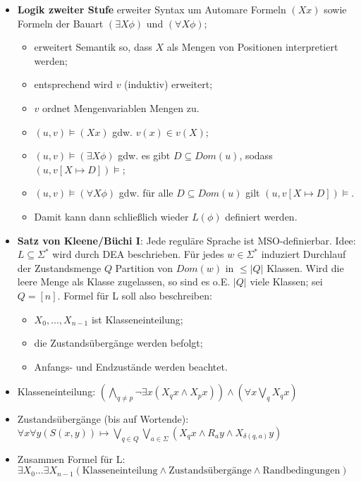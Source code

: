 \documentclass[12pt, a4paper]{article}
\begin{document}
\begin{itemize}
		\item \textbf{Logik zweiter Stufe} erweiter Syntax um Automare Formeln $(Xx)$ sowie Formeln der Bauart $(\exists X\phi)$ und $(\forall X\phi)$;
		\begin{itemize}
			\item erweitert Semantik so, dass $X$ als Mengen von Positionen interpretiert werden;
			\item entsprechend wird $v$ (induktiv) erweitert; 
			\item $v$ ordnet Mengenvariablen Mengen zu.
			\item $(u,v)\vDash (Xx)$ gdw. $v(x)\in v(X)$;
			\item $(u,v)\vDash (\exists X\phi)$ gdw. es gibt $D\subseteq Dom(u)$, sodass $(u,v[X\mapsto D]) \vDash $;
			\item $(u,v)\vDash (\forall X\phi)$ gdw. für alle $D\subseteq Dom(u)$ gilt $(u,v[X\mapsto D]) \vDash$.
			\item Damit kann dann schließlich wieder $L(\phi)$ definiert werden.
		\end{itemize}
		
		\item \textbf{Satz von Kleene/Büchi I}: Jede reguläre Sprache ist MSO-definierbar.
			\subitem Idee: $L\subseteq\Sigma^{*}$ wird durch DEA beschrieben.
			\subitem Für jedes $w\in\Sigma^{*}$ induziert Durchlauf der Zustandsmenge $Q$ Partition von $Dom(w)$ in $\leq|Q|$ Klassen. Wird die leere Menge als Klasse zugelassen, so sind es o.E. $|Q|$ viele Klassen; sei $Q = [n]$.
			\subitem Formel für L soll also beschreiben:
			\begin{itemize}
				\item $X_{0},...,X_{n-1}$ ist Klasseneinteilung;
				\item die Zustandsübergänge werden befolgt;
				\item Anfangs- und Endzustände werden beachtet.
			\end{itemize}
		
		\item Klasseneinteilung: $(\underset{q\neq p}{\bigwedge}\neg\exists x(X_{q}x\wedge X_{p}x))\wedge(\forall x\underset{q}{\bigvee}X_{q}x)$
		
		\item Zustandsübergänge (bis auf Wortende): $\forall x\forall y(S(x,y))\mapsto\underset{q\in Q}{\bigvee}\underset{a\in\Sigma}{\bigvee}(X_{q}x\wedge R_{a}y\wedge X_{\delta(q,a)}y)$
		
		\item Zusammen Formel für L: $\exists X_{0}...\exists X_{n-1} (\text{Klasseneinteilung}\wedge\text{Zustandsübergänge}\wedge\text{Randbedingungen})$
		

\end{itemize}
\end{document}
